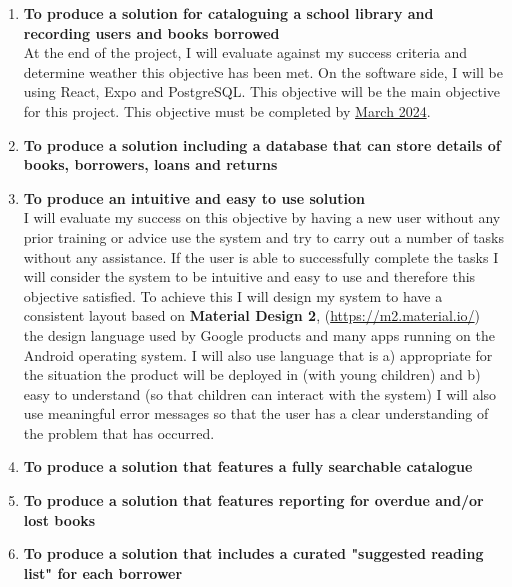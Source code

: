 \documentclass{article}
\begin{document}
\begin{enumerate}
    \item \textbf{To produce a solution for cataloguing a school library and recording users and books borrowed}\\
    At the end of the project, I will evaluate against my success criteria and determine weather this objective has been met.
    On the software side, I will be using React, Expo and PostgreSQL. This objective will be the main objective for this project.
    This objective must be completed by \underline{March 2024}.

    \item \textbf{To produce a solution including a database that can store details of books, borrowers, loans and returns}\\
    
    \item \textbf{To produce an intuitive and easy to use solution}\\
    I will evaluate my success on this objective by having a new user without any prior training or advice use the system and
    try to carry out a number of tasks without any assistance. If the user is able to successfully complete the tasks
    I will consider the system to be intuitive and easy to use and therefore this objective satisfied.
    To achieve this I will design my system to have a consistent layout based on \textbf{Material Design 2}, (\url{https://m2.material.io/})
    the design language used by Google products and many apps running on the Android operating system. I will also use language that is
    a) appropriate for the situation the product will be deployed in (with young children) and b) easy to understand (so that children can interact with the system)
    I will also use meaningful error messages so that the user has a clear understanding of the problem that has occurred.

    \item \textbf{To produce a solution that features a fully searchable catalogue}
    
    \item \textbf{To produce a solution that features reporting for overdue and/or lost books}
    \item \textbf{To produce a solution that includes a curated "suggested reading list" for each borrower}
\end{enumerate}
\end{document}
